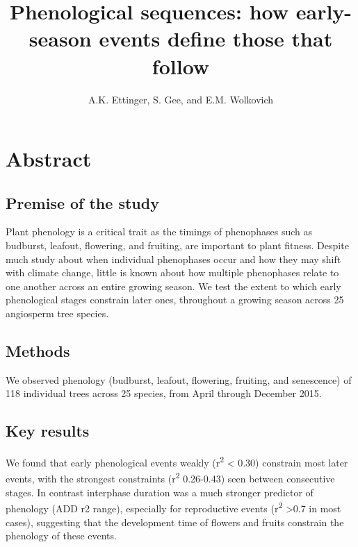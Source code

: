 \documentclass{article}
\begin{document}

\title{Phenological sequences: how early-season events define those that follow} %
\author{A.K. Ettinger, S. Gee, and E.M. Wolkovich}
\maketitle %


\section*{Abstract}
\subsection*{Premise of the study}
Plant phenology is a critical trait as the timings of phenophases such as budburst, leafout, flowering, and fruiting, are important to plant fitness. Despite much study about when individual phenophases occur and how they may shift with climate change, little is known about how multiple phenophases relate to one another across an entire growing season. We test the extent to which early phenological stages constrain later ones, throughout a growing season across 25 angiosperm tree species. 
\subsection*{Methods}
We observed phenology (budburst, leafout, flowering, fruiting, and senescence) of 118 individual trees across 25 species, from April through December 2015. 
\subsection*{Key results}
We found that early phenological events weakly (r\textsuperscript{2} < 0.30) constrain most later events, with the strongest constraints (r\textsuperscript{2} 0.26-0.43) seen between consecutive stages. In contrast interphase duration was a much stronger predictor of phenology (ADD r2 range), especially for reproductive events (r\textsuperscript{2} >0.7 in most cases), suggesting that the development time of flowers and fruits constrain the phenology of these events.
\end{document}
